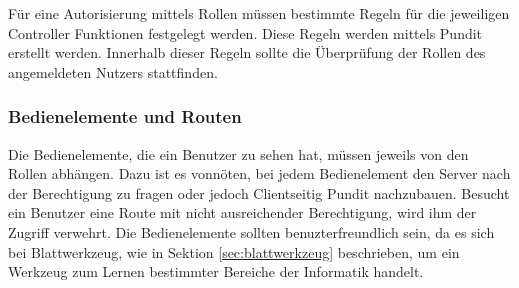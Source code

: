 
Für eine Autorisierung mittels Rollen müssen bestimmte Regeln für die jeweiligen Controller Funktionen festgelegt werden. Diese Regeln werden mittels Pundit erstellt werden. Innerhalb dieser Regeln sollte die Überprüfung der Rollen des angemeldeten Nutzers stattfinden.


\subsubsection{Bedienelemente und Routen}
Die Bedienelemente, die ein Benutzer zu sehen hat, müssen jeweils von den Rollen abhängen. Dazu ist es vonnöten, bei jedem Bedienelement den Server nach der Berechtigung zu fragen oder jedoch Clientseitig Pundit nachzubauen. Besucht ein Benutzer eine Route mit nicht ausreichender Berechtigung, wird ihm der Zugriff verwehrt. Die Bedienelemente sollten benuzterfreundlich sein, da es sich bei Blattwerkzeug, wie in Sektion \ref{sec:blattwerkzeug} beschrieben, um ein Werkzeug zum Lernen bestimmter Bereiche der Informatik handelt.

